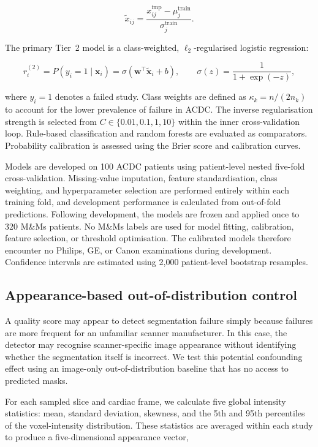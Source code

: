 \documentclass[runningheads]{llncs}
\begin{document}
\begin{equation}
\widetilde{x}_{ij}
=
\frac{x^{\mathrm{imp}}_{ij}-\mu_j^{\mathrm{train}}}
{\sigma_j^{\mathrm{train}}}.
\end{equation}

The primary Tier~2 model is a class-weighted, $\ell_2$-regularised logistic regression:

\begin{equation}
r_i^{(2)}
=
P(y_i=1\mid\mathbf{x}_i)
=
\sigma\!\left(
\mathbf{w}^{\top}\widetilde{\mathbf{x}}_i+b
\right),
\qquad
\sigma(z)=\frac{1}{1+\exp(-z)},
\end{equation}

where $y_i=1$ denotes a failed study. Class weights are defined as $\kappa_k=n/(2n_k)$ to account for the lower prevalence of failure in ACDC. The inverse regularisation strength is selected from $C\in\{0.01,0.1,1,10\}$ within the inner cross-validation loop. Rule-based classification and random forests are evaluated as comparators. Probability calibration is assessed using the Brier score and calibration curves.

Models are developed on 100 ACDC patients using patient-level nested five-fold cross-validation. Missing-value imputation, feature standardisation, class weighting, and hyperparameter selection are performed entirely within each training fold, and development performance is calculated from out-of-fold predictions. Following development, the models are frozen and applied once to 320 M\&Ms patients. No M\&Ms labels are used for model fitting, calibration, feature selection, or threshold optimisation. The calibrated models therefore encounter no Philips, GE, or Canon examinations during development. Confidence intervals are estimated using 2,000 patient-level bootstrap resamples.


\subsection{Appearance-based out-of-distribution control}

A quality score may appear to detect segmentation failure simply because failures are more frequent for an unfamiliar scanner manufacturer. In this case, the detector may recognise scanner-specific image appearance without identifying whether the segmentation itself is incorrect. We test this potential confounding effect using an image-only out-of-distribution baseline that has no access to predicted masks.

For each sampled slice and cardiac frame, we calculate five global intensity statistics: mean, standard deviation, skewness, and the 5th and 95th percentiles of the voxel-intensity distribution. These statistics are averaged within each study to produce a five-dimensional appearance vector,
\end{document}

